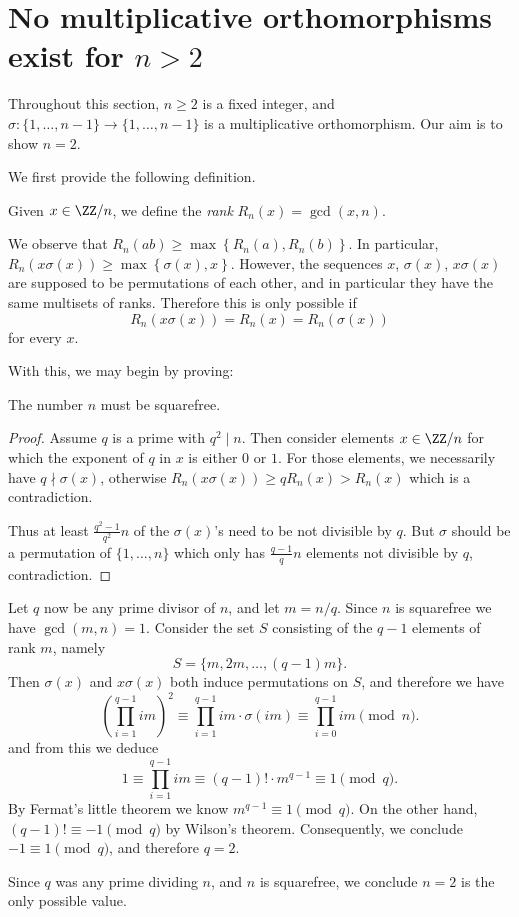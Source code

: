 \section{No multiplicative orthomorphisms exist for $n > 2$}
\label{sec:nomult}
Throughout this section, $n \ge 2$ is a fixed integer,
and $\sigma : \{1, \dots, n-1\} \to \{1, \dots, n-1\}$
is a multiplicative orthomorphism.
Our aim is to show $n = 2$.

We first provide the following definition.
\begin{definition}
	Given $x \in \ZZ/n$,
	we define the \emph{rank} $R_n(x) = \gcd(x, n)$.
\end{definition}
We observe that $R_n(ab) \ge \max \left\{ R_n(a), R_n(b) \right\}$.
In particular, $R_n(x\sigma(x)) \ge \max\left\{ \sigma(x), x \right\}$.
However, the sequences $x$, $\sigma(x)$, $x\sigma(x)$
are supposed to be permutations of each other,
and in particular they have the same multisets of ranks.
Therefore this is only possible if
\[ R_n \left( x \sigma(x) \right) = R_n(x) = R_n(\sigma(x)) \]
for every $x$.

With this, we may begin by proving:
\begin{proposition}
	The number $n$ must be squarefree.
	\label{prop:mult_squarefree}
\end{proposition}
\begin{proof}
	Assume $q$ is a prime with $q^2 \mid n$.
	Then consider elements $x \in \ZZ/n$
	for which the exponent of $q$ in $x$ is either $0$ or $1$.
	For those elements, we necessarily have $q \nmid \sigma(x)$,
	otherwise $R_n(x\sigma(x)) \ge q R_n(x) > R_n(x)$ which is a contradiction.

	Thus at least $\frac{q^2-1}{q^2} n$ of the $\sigma(x)$'s
	need to be not divisible by $q$.
	But $\sigma$ should be a permutation of $\{1, \dots, n\}$
	which only has $\frac{q-1}{q} n$ elements not divisible by $q$,
	contradiction.
\end{proof}

Let $q$ now be any prime divisor of $n$,
and let $m = n/q$.
Since $n$ is squarefree we have $\gcd(m, n) = 1$.
Consider the set $S$ consisting of the $q-1$ elements of rank $m$,
namely \[ S = \{m, 2m, \dots, (q-1)m \}. \]
Then $\sigma(x)$ and $x\sigma(x)$ both induce permutations on $S$,
and therefore we have
\[  \left( \prod_{i=1}^{q-1} im  \right)^2
	\equiv \prod_{i=1}^{q-1} im \cdot \sigma(im)
	\equiv \prod_{i=0}^{q-1} im \pmod{n}. \]
and from this we deduce
\[ 1 \equiv \prod_{i=1}^{q-1} im
	\equiv (q-1)! \cdot m^{q-1} \equiv 1 \pmod q. \]
By Fermat's little theorem we know $m^{q-1} \equiv 1 \pmod q$.
On the other hand, $(q-1)! \equiv -1 \pmod q$ by Wilson's theorem.
Consequently, we conclude $-1 \equiv 1 \pmod q$,
and therefore $q = 2$.

Since $q$ was any prime dividing $n$, and $n$ is squarefree,
we conclude $n = 2$ is the only possible value.
